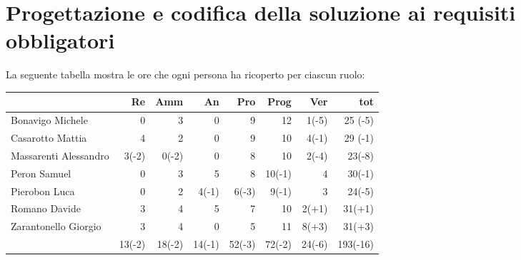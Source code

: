 \section{Progettazione e codifica della soluzione ai requisiti obbligatori}

La seguente tabella mostra le ore che ogni persona ha ricoperto per ciascun ruolo:

\begin{table}[ht]
    \begin{tabularx}{\linewidth}{X|rrrrrrr}
    \rowcolor{gray!30}& Re & Amm & An & Pro & Prog & Ver & tot \\
    \hline
    Bonavigo Michele                        & 0      & 3         & 0         & 9      & 12     & 1(-5)    & 25 (-5) \\ 
 
    \rowcolor{gray!10}Casarotto Mattia      & 4      & 2         & 0         & 9      & 10     & 4(-1)    & 29 (-1)\\ 
 
    Massarenti Alessandro                   & 3(-2)  & 0(-2)     & 0         & 8      & 10     & 2(-4)    & 23(-8) \\ 
 
    \rowcolor{gray!10}Peron Samuel          & 0      & 3         & 5         & 8      & 10(-1) & 4        & 30(-1) \\  
 
    Pierobon Luca                           & 0      & 2         & 4(-1)     & 6(-3)  & 9(-1)  & 3        & 24(-5) \\ 
 
    \rowcolor{gray!10}Romano Davide         & 3      & 4         & 5         & 7      & 10     & 2(+1)    & 31(+1) \\ 
 
    Zarantonello Giorgio                    & 3      & 4         & 0         & 5      & 11     & 8(+3)    & 31(+3) \\ 
 
    \hline                                  & 13(-2) & 18(-2)    & 14(-1)   & 52(-3)  & 72(-2) & 24(-6)   & 193(-16) \\ 
    \end{tabularx}
\end{table}

